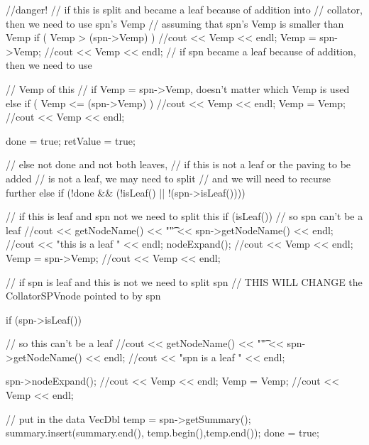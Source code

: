\begin{DoxyCode}
{{{                //danger!
                // if this is split and became a leaf because of addition into 
                // collator, then we need to use spn's Vemp
                // assuming that spn's Vemp is smaller than Vemp
          if ( Vemp > (spn->Vemp) ) {
            //cout << Vemp << endl;
            Vemp = spn->Vemp;
            //cout << Vemp << endl;
          }
               // if spn became a leaf because of addition, then we need to use
       
               // Vemp of this
               // if Vemp = spn->Vemp, doesn't matter which Vemp is used
               else if ( Vemp <= (spn->Vemp) ) {
            //cout << Vemp << endl;
            Vemp = Vemp;
            //cout << Vemp << endl;
          }
               
                done = true;
                retValue = true;
            }

            // else not done and not both leaves,
            // if this is not a leaf or the paving to be added
            // is not a leaf, we may need to split
            // and we will need to recurse further
            else if (!done && (!isLeaf() || !(spn->isLeaf()))) {
                // if this is leaf and spn not we need to split this
                if (isLeaf()) { // so spn can't be a leaf
                     //cout << getNodeName() << "\t" << spn->getNodeName() <<
       endl;
                     //cout << "this is a leaf " << endl;
                     nodeExpand();
                     //cout << Vemp << endl;
              Vemp = spn->Vemp;    
              //cout << Vemp << endl;  
                }

                // if spn is leaf and this is not we need to split spn
                // THIS WILL CHANGE the CollatorSPVnode pointed to by spn

                if (spn->isLeaf()) { // so this can't be a leaf
              //cout << getNodeName() << "\t" << spn->getNodeName() << endl;
                     //cout << "spn is a leaf " << endl;
              
              spn->nodeExpand();
                     //cout << Vemp << endl;
              Vemp = Vemp;    
              //cout << Vemp << endl;   
                }

                // put in the data
                VecDbl temp = spn->getSummary();
                summary.insert(summary.end(), temp.begin(),temp.end());
                done = true;
                               
}}}
\end{DoxyCode}
